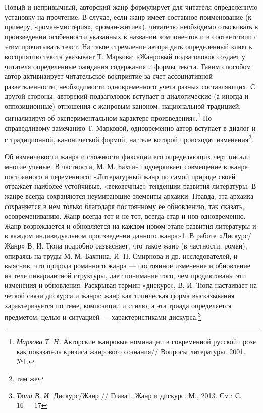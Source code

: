 \documentclass{kursa4}
\begin{document}
    Новый и непривычный, авторский жанр формулирует для читателя определенную установку на прочтение. В случае, если жанр имеет составное поименование (к примеру, «роман-мистерия», «роман-житие»), читателю необходимо отыскивать в произведении особенности указанных в названии компонентов и в соответствии с этим прочитывать текст. На такое стремление автора дать определенный ключ к восприятию текста указывает Т. Маркова:\newline
    «Жанровый подзаголовок создает у читателя определенные ожидания содержания и формы текста. Таким способом автор активизирует читательское восприятие за счет ассоциативной разветвленности, необходимости одновременного учета разных составляющих. С другой стороны, авторский подзаголовок вступает в диалогические (а иногда и оппозиционные) отношения с жанровым каноном, национальной традицией, сигнализируя об экспериментальном характере произведения».\footnote{{ }\textit{Маркова Т. Н.} Авторские жанровые номинации в современной русской прозе как показатель кризиса жанрового сознания// Вопросы литературы. 2001. №1.} По справедливому замечанию Т. Марковой, одновременно автор вступает в диалог и с традиционной, канонической формой, на теле которой происходят изменения\footnote{там же}. 

    Об изменчивости жанра и сложности фиксации его определяющих черт писали многие ученые. В частности, М. М. Бахтин подчеркивает совмещение в жанре постоянного и переменного: «Литературный жанр по самой природе своей отражает наиболее устойчивые, «вековечные» тенденции развития литературы. В жанре всегда сохраняются неумирающие элементы архаики. Правда, эта архаика сохраняется в нем только благодаря постоянному ее обновлению, так сказать, осовремениванию. Жанр всегда тот и не тот, всегда стар и нов одновременно. Жанр возрождается и обновляется на каждом новом этапе развития литературы и в каждом индивидуальном произведении данного жанра»1.  
    В работе «Дискурс/Жанр» В. И. Тюпа подробно разъясняет, что такое жанр (в частности, роман), опираясь на труды М. М. Бахтина, И. П. Смирнова и др. исследователей, и выяснив, что природа романного жанра — постоянное изменение и обновление на теле инвариантной структуры, дает понимание того, чем продиктованы эти изменения и обновления. Раскрывая термин «дискурс», В. И. Тюпа настаивает на четкой связи дискурса и жанра: жанр как типическая форма высказывания характеризуется по теме, композиции и стилю, а эта триада определяется предметом, целью и ситуацией — характеристиками дискурса.\footnote{\textit{Тюпа В. И.} Дискурс/Жанр // Глава1. Жанр и дискурс. М., 2013. См.: С. 16~---17} 
\end{document}
